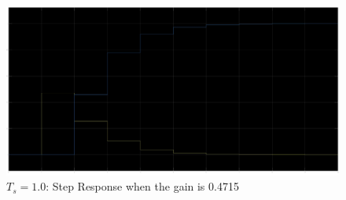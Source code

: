 \documentclass[stu, a4paper, 12pt, floatsintext]{apa7}
\numberwithin{figure}{section}
\numberwithin{table}{section}
\numberwithin{equation}{section}
\begin{document}
\begin{figure}[H]
    \caption{$T_s = 1.0$: Step Response when the gain is 0.4715}
    \label{fig:1.0_Ts_step_response_2}
    \centering
    \includegraphics[width=1.1\textwidth]{pictures/task2_1.0_step_response_2.jpg}
\end{figure}
\end{document}

